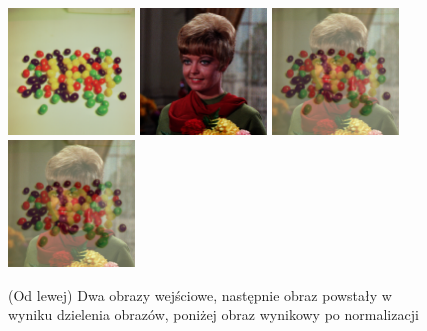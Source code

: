 \documentclass[final,a4paper,openany,12pt]{mwbk}
\begin{document}
\begin{figure}[H]
	\begin{center}
		\includegraphics[width=0.3\textwidth]{2/2Color_Div_Img1_Original}
		\includegraphics[width=0.3\textwidth]{2/2Color_Div_Img2_Original}
		\includegraphics[width=0.3\textwidth]{2/2Color_Div_Img_Result}
		\includegraphics[width=0.3\textwidth]{2/2Color_Div_Img_Result_Norm}
	\end{center}
	\caption{(Od lewej) Dwa obrazy wejściowe, następnie obraz powstały w wyniku dzielenia obrazów, poniżej obraz wynikowy po normalizacji }
\end{figure}
\end{document}
